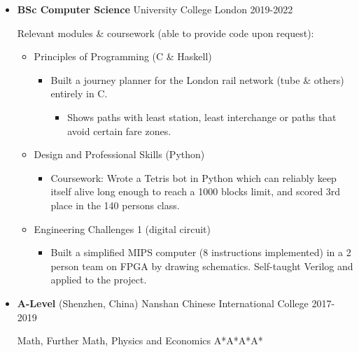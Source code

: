   \begin{itemize}
    \def\ongoing{%
    }
    \item \ongoing{} \textbf{BSc Computer Science} \dashdiv{} University College London \dashdiv{} 2019-2022

      Relevant modules \& coursework (able to provide code upon request):

      \begin{itemize}

        \item Principles of Programming (C \& Haskell)

        \begin{itemize}
          \item Built a journey planner for the\tflicon{} London rail network (tube \& others) entirely in C.

          \begin{itemize}
            \item Shows paths with least station, least interchange or paths that avoid certain fare zones.
          \end{itemize}
        \end{itemize}

        \item Design and Professional Skills (Python)

        \begin{itemize}
          \item Coursework: Wrote a Tetris bot in Python which can reliably keep itself alive long enough to reach a 1000 blocks limit, and scored 3rd place in the 140 persons class.
        \end{itemize}

        \item Engineering Challenges 1 (digital circuit)

        \begin{itemize}
          \item Built a simplified MIPS computer (8 instructions implemented) in a 2 person team on FPGA by drawing schematics. Self-taught Verilog and applied to the project.
        \end{itemize}

      \end{itemize}

    \item \textbf{A-Level} \dashdiv{} (Shenzhen, China) Nanshan Chinese International College \dashdiv{} 2017-2019

      Math, Further Math, Physics and Economics \dashdiv{} A*A*A*A*
  \end{itemize}

